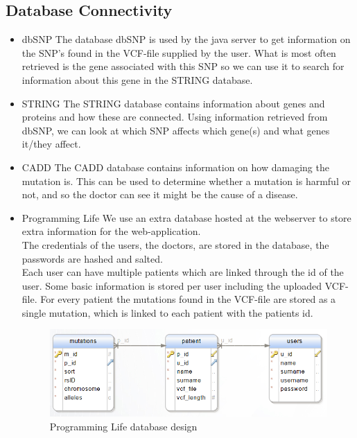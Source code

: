 	\subsection{Database Connectivity}
		\begin{itemize}
			\item dbSNP
				\subitem The database dbSNP is used by the java server to get information on the SNP's found in the VCF-file supplied by the user. What is most often retrieved is the gene associated with this SNP so we can use it to search for information about this gene in the STRING database.
			\item STRING
				\subitem The STRING database contains information about genes and proteins and how these are connected. Using information retrieved from dbSNP, we can look at which SNP affects which gene(s) and what genes it/they affect.
			\item CADD
				\subitem The CADD database contains information on how damaging the mutation is. This can be used to determine whether a mutation is harmful or not, and so the doctor can see it might be the cause of a disease.
			\item Programming Life
				\subitem We use an extra database hosted at the webserver to store extra information for the web-application. \\
				The credentials of the users, the doctors, are stored in the database, the passwords are hashed and salted.\\
				Each user can have multiple patients which are linked through the id of the user.
				Some basic information is stored per user including the uploaded VCF-file.
				For every patient the mutations found in the VCF-file are stored as a single mutation, which is linked to each patient with the patients id.\\
				\begin{figure}
					\centering
					\includegraphics[scale=0.55]{erd.png}
					\caption{Programming Life database design}
				\end{figure}
		\end{itemize}
		
